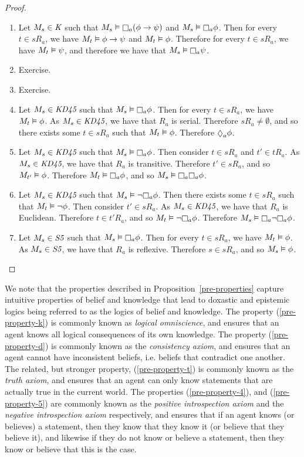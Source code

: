 \begin{proof}
\begin{enumerate}
\item Let $M_s \in \textit{K}{}$ such that $M_s \entails \knows_a (\phi \implies \psi)$
and $M_s \entails \knows_a \phi$. Then for every $t \in sR_a$, we have $M_t
\vDash \phi \rightarrow \psi$ and $M_t \vDash \phi$. Therefore for every $t \in sR_a$,
we have $M_t \vDash \psi$, and therefore we have that $M_s \entails \knows_a \psi$.
\item Exercise.
\item Exercise.
\item Let $M_s \in \textit{KD45}{}$ such that $M_s \entails \knows_a \phi$. Then for
every $t \in sR_a$, we have $M_t \vDash \phi$. As $M_s \in \textit{KD45}{}$, we have
that $R_a$ is serial. Therefore $sR_a \neq \emptyset$, and so there exists some
$t \in sR_a$ such that $M_t \vDash \phi$. Therefore $\suspects_a \phi$.
\item Let $M_s \in \textit{KD45}{}$ such that $M_s \entails \knows_a \phi$. Then
consider $t \in sR_a$ and $t' \in tR_a$. As $M_s \in \textit{KD45}{}$, we have that
$R_a$ is transitive. Therefore $t' \in sR_a$, and so $M_{t'} \vDash \phi$.
Therefore $M_t \entails \knows_a \phi$, and so $M_s \entails \knows_a \knows_a \phi$. 
\item Let $M_s \in \textit{KD45}{}$ such that $M_s \entails \neg \knows_a \phi$. Then
there exists some $t \in sR_a$ such that $M_t \vDash \neg \phi$. Then consider
$t' \in sR_a$. As $M_s \in \textit{KD45}{}$, we have that $R_a$ is Euclidean.
Therefore $t \in t'R_a$, and so $M_t \entails \neg \knows_a \phi$. Therefore $M_s
\entails \knows_a \neg \knows_a \phi$.
\item Let $M_s \in \textit{S5}{}$ such that $M_s \entails \knows_a \phi$. Then for
every $t \in sR_a$, we have $M_t \vDash \phi$. As $M_s \in \textit{S5}{}$, we have
that $R_a$ is reflexive. Therefore $s \in sR_a$, and so $M_s \vDash \phi$.
\end{enumerate}
\end{proof}

We note that the properties described in Proposition~\ref{pre-properties}
capture intuitive properties of belief and knowledge that lead to doxastic and
epistemic logics being referred to as the logics of belief and knowledge. The
property (\ref{pre-property-k}) is commonly known as {\em logical omniscience},
and ensures that an agent knows all logical consequences of its own knowledge.
The property (\ref{pre-property-d}) is commonly known as the {\em consistency
axiom}, and ensures that an agent cannot have inconsistent beliefs, i.e. beliefs
that contradict one another.  The related, but stronger property,
(\ref{pre-property-t}) is commonly known as the {\em truth axiom}, and ensures
that an agent can only know statements that are actually true in the current
world. The properties (\ref{pre-property-4}), and (\ref{pre-property-5}) are
commonly known as the {\em positive introspection axiom} and the {\em negative
introspection axiom} respectively, and ensures that if an agent knows (or
believes) a statement, then they know that they know it (or believe that they
believe it), and likewise if they do not know or believe a statement, then they
know or believe that this is the case.

